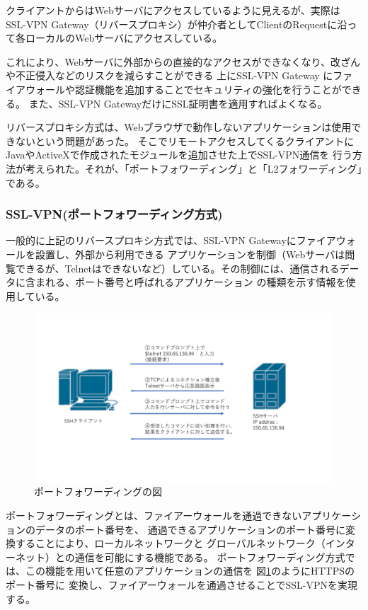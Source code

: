 \documentclass[11pt,a4j,titlepage]{jreport}
\begin{document}
クライアントからはWebサーバにアクセスしているように見えるが、実際は
SSL-VPN Gateway（リバースプロキシ）が仲介者としてClientのRequestに沿って各ローカルのWebサーバにアクセスしている。

これにより、Webサーバに外部からの直接的なアクセスができなくなり、改ざんや不正侵入などのリスクを減らすことができる
上にSSL-VPN Gateway にファイアウォールや認証機能を追加することでセキュリティの強化を行うことができる。
また、SSL-VPN GatewayだけにSSL証明書を適用すればよくなる。

リバースプロキシ方式は、Webブラウザで動作しないアプリケーションは使用できないという問題があった。
そこでリモートアクセスしてくるクライアントにJavaやActiveXで作成されたモジュールを追加させた上でSSL-VPN通信を
行う方法が考えられた。それが、「ポートフォワーディング」と「L2フォワーディング」である。

\subsubsection*{SSL-VPN(ポートフォワーディング方式)}

一般的に上記のリバースプロキシ方式では、SSL-VPN Gatewayにファイアウォールを設置し、外部から利用できる
アプリケーションを制御（Webサーバは閲覧できるが、Telnetはできないなど）している。その制御には、通信されるデータに含まれる、ポート番号と呼ばれるアプリケーション
の種類を示す情報を使用している。
\begin{figure}[tbp]
    \centering
    \includegraphics[width=1.0\textwidth, page=17]{graphs/network_archtecture.pdf}
    \caption{ポートフォワーディングの図}
    \label{portfowarding}
\end{figure}

ポートフォワーディングとは、ファイアーウォールを通過できないアプリケーションのデータのポート番号を、
通過できるアプリケーションのポート番号に変換することにより、ローカルネットワークと
グローバルネットワーク（インターネット）との通信を可能にする機能である。
ポートフォワーディング方式では、この機能を用いて任意のアプリケーションの通信を
図\ref{portfowarding}のようにHTTPSのポート番号に
変換し、ファイアーウォールを通過させることでSSL-VPNを実現する。
\end{document}

